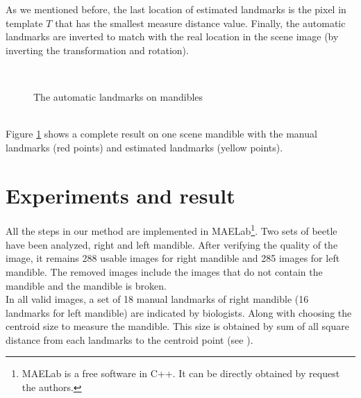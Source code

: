 \documentclass[twoside,twocolumn,10pt]{article}
\begin{document}
As we mentioned before, the last location of
estimated landmarks is the pixel in template \textit{$T$} that has the smallest measure distance value. Finally, the automatic landmarks are inverted to match with the real location in the scene image (by inverting the transformation and rotation).\\
\begin{figure}[h]
\centering
{}~~
\caption{The automatic landmarks on mandibles}
\label{figresult}
\end{figure}~\\
Figure \ref{figresult} shows a complete result on one scene mandible with the manual landmarks (red points) and estimated landmarks (yellow points).
\section{Experiments and result}
All the steps in our method are implemented in MAELab\footnote{MAELab
  is a free software in C++. It can be directly obtained by request
  the authors.}. Two sets of beetle have been analyzed, right and left
mandible. After verifying the quality of the image, it remains 288
usable images for right mandible and 285 images for left mandible. The
removed images include the images that do not contain the mandible and
the mandible is broken.\\

In all valid images, a set of 18 manual landmarks of right mandible
(16 landmarks for left mandible) are indicated by biologists. Along
with choosing the centroid size to measure the mandible. This size is
obtained by sum of all square distance from each landmarks to the
centroid point (see \cite{web2010}).
\end{document}
